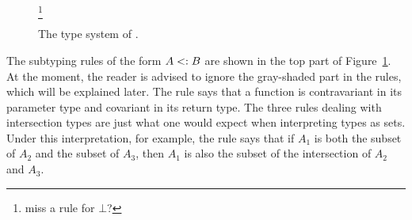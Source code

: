 \begin{figure}


  \footnote{miss a rule for $\bot$?}


  \caption{The type system of \name.}
  \label{fig:fi-type}
\end{figure}




The subtyping rules of the form $A <: B$ are shown in the top part of
Figure~\ref{fig:fi-type}. At the moment, the reader is advised to ignore the
gray-shaded part in the rules, which will be explained later. The rule
 says that a function is contravariant in its parameter
type and covariant in its return type. The three rules dealing with
intersection types are just what one would expect when interpreting types as
sets. Under this interpretation, for example, the rule 
says that if $A_1$ is both the subset of $A_2$ and the subset of $A_3$, then
$A_1$ is also the subset of the intersection of $A_2$ and $A_3$.

